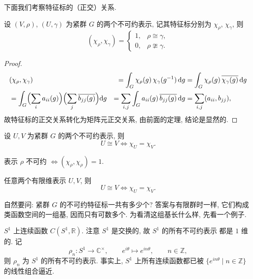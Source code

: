 下面我们考察特征标的（正交）关系.

\begin{theorem}[特征标的正交关系]\label{thm:character-orthogonality-compact}
设 $(V,\rho)$, $(U,\gamma)$ 为紧群 $G$ 的两个不可约表示, 记其特征标分别为
$\chi_\rho$, $\chi_\gamma$, 则
\[
  (\chi_\rho,\chi_\gamma)=
  \begin{cases}
    1, & \rho\cong\gamma,\\
    0, & \rho\ncong\gamma .
  \end{cases}
\]
\end{theorem}

\begin{proof}
\[\begin{aligned}
  &(\chi_\rho,\chi_\gamma)
  &=\int_G\chi_\rho(g)\,\chi_\gamma(g^{-1})\,\mathrm{d}g
  &=\int_G\chi_\rho(g)\,\overline{\chi_\gamma(g)}\,\mathrm{d}g\\
  &=\int_G\Bigl(\sum_{i}a_{ii}(g)\Bigr)\Bigl(\sum_{j}\overline{b_{jj}(g)}\Bigr)\mathrm{d}g
  &=\sum_{i,j}\int_G a_{ii}(g)\,\overline{b_{jj}(g)}\,\mathrm{d}g
  &=\sum_{i,j}(a_{ii},b_{jj}),
\end{aligned}\]
故特征标的正交关系转化为矩阵元正交关系, 由前面的定理, 结论是显然的.
\end{proof}

\begin{corollary}\label{cor:compact-iso-char}
设 $U,V$ 为紧群 $G$ 的两个不可约表示, 则
\[
  U\cong V\iff\chi_U=\chi_V .
\]
\end{corollary}

\begin{corollary}\label{cor:compact-irreducible-test}
表示 $\rho$ 不可约 $\iff(\chi_\rho,\chi_\rho)=1$.
\end{corollary}

\begin{corollary}\label{cor:compact-iso-general}
任意两个有限维表示 $U,V$, 则
\[
  U\cong V\iff\chi_U=\chi_V .
\]
\end{corollary}

自然要问: 紧群 $G$ 的不可约特征标一共有多少个? 答案与有限群时一样, 它们构成类函数空间的一组基,
因而只有可数多个. 为看清这组基长什么样, 先看一个例子.

\begin{example}\label{ex:S1-reps}
$S^1$ 上连续函数 $C(S^1,\mathbb{R})$. 注意 $S^1$ 是交换的, 故 $S^1$ 的所有不可约表示
  都是 $1$ 维的. 记
  \[
    \rho_n\colon S^1\to\mathbb{C}^{\times},\qquad e^{i\theta}\longmapsto e^{in\theta},
    \qquad n\in\mathbb{Z},
  \]
  则 $\rho_n$ 为 $S^1$ 的所有不可约表示. 事实上, $S^1$ 上所有连续函数都已被
  $\{e^{in\theta}\mid n\in\mathbb{Z}\}$ 的线性组合逼近.
\end{example}

